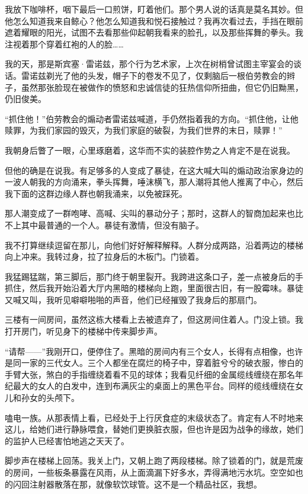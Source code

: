 \documentclass[AutoFakeBold=true]{book}
\begin{document}
我放下咖啡杯，咽下最后一口煎饼，盯着他们。那个男人说的话真是莫名其妙。但他怎么知道我来自鲸心？他怎么知道我和悦石接触过？我再次看过去，手挡在眼前遮着耀眼的阳光，试图不去看那些仰起朝我看来的脸孔，以及那些挥舞的拳头。我注视着那个穿着红袍的人的脸……

我的天，那是斯宾塞·雷诺兹，那个行为艺术家，上次在树梢曾试图主宰宴会的谈话。雷诺兹剃光了他的头发，帽子下的卷发不见了，仅剩脑后一根伯劳教会的辫子，虽然那张脸现在被做作的愤怒和忠诚信徒的狂热信仰所扭曲，但它仍旧黝黑，仍旧俊美。

``抓住他！''伯劳教会的煽动者雷诺兹喊道，手仍然指着我的方向。``抓住他，让他赎罪，为我们家园的毁灭，为我们家庭的破裂，为我们世界的末日，赎罪！''

我朝身后瞥了一眼，心里琢磨着，这华而不实的装腔作势之人肯定不是在说我。

但他的确是在说我。有足够多的人变成了暴徒，在这大喊大叫的煽动政治家身边的一波人朝我的方向涌来，拳头挥舞，唾沫横飞，那人潮将其他人推离了中心，然后我下面的这群边缘人群也朝我涌来，以免被踩死。

那人潮变成了一群咆哮、高喊、尖叫的暴动分子；那时，这群人的智商加起来也比不上其中最普通的一个人。暴徒有激情，但没有脑子。

我不打算继续逗留在那儿，向他们好好解释解释。人群分成两路，沿着两边的楼梯向上冲来。我转过身，拉了拉身后的木板门。门锁着。

我猛踢猛踹，第三脚后，那门终于朝里裂开。我跨进这条口子，差一点被身后的手抓住，然后我开始沿着大厅内黑暗的楼梯向上跑，里面很古旧，有一股霉味。暴徒又喊又叫，我听见噼噼啪啪的声音，他们已经摧毁了我身后的那扇门。

三楼有一间房间，虽然这栋大楼看上去被遗弃了，但这房间住着人。门没上锁。我打开房门，听见身下的楼梯中传来脚步声。

``请帮——''我刚开口，便停住了。黑暗的房间内有三个女人，长得有点相像，也许是同一家的三代女人。三个人都坐在腐烂的椅子中，穿着脏兮兮的破衣服，惨白的手臂大张，煞白的手指缠绕着看不见的球体；我看见纤细的金属缆线缠绕在那名年纪最大的女人的白发中，连到布满灰尘的桌面上的黑色平台。同样的缆线缠绕在女儿和孙女的头颅下。

嗑电一族。从那表情上看，已经处于上行厌食症的末级状态了。肯定有人不时地来这儿，给她们进行静脉喂食，替她们更换脏衣服，但也许是因为战争的缘故，她们的监护人已经害怕地逃之天天了。

脚步声在楼梯上回荡。我关上门，又朝上跑了两段楼梯。除了锁着的门，就是荒废的房间，一些板条暴露在风雨，从上面滴漏下好多水，弄得满地污水坑。空空如也的闪回注射器散落在那，就像软饮球管。{\kaishu 这不是一个精品社区，}我想。
\end{document}
